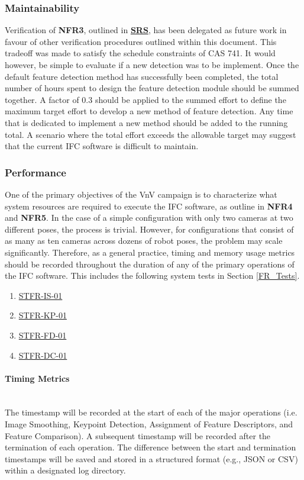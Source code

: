 \documentclass[12pt, titlepage]{article}
\begin{document}
\subsubsection{Maintainability}\label{Maintainability}
Verification of \textbf{NFR3}, outlined in 
\textbf{\href{https://github.com/KiranSingh15/CAS-741-Image-Correspondences/blob/main/docs/SRS/SRS.pdf}
{SRS}}, 
has been delegated as future work in favour of other verification procedures outlined within this 
document. This tradeoff was made to satisfy the schedule constraints of CAS 741. 
It would however, be simple to evaluate if a new detection was to be implement. Once the default feature 
detection method has successfully been completed, the total number of hours spent to design the feature 
detection module should be summed together. A factor of 0.3 should be applied to the summed effort to define 
the maximum target effort to develop a new method of feature detection. Any time that is dedicated to 
implement a new method should be added to the running total. A scenario where the total effort exceeds the 
allowable target may suggest that the current IFC software is difficult to maintain.

\subsubsection{Performance}\label{Performance}
One of the primary objectives of the VnV campaign is to characterize what system resources are required to 
execute the IFC software, as outline in \textbf{NFR4} and \textbf{NFR5}. In the case of a simple configuration 
with only two cameras at two different poses, the process is trivial. However, for configurations that consist 
of as many as ten cameras across dozens of robot poses, the problem may scale significantly. Therefore, as a 
general practice, timing and memory usage metrics should be recorded throughout the duration of any of the 
primary operations of the IFC software. This includes the following system tests in Section \ref{FR_Tests}. 
\begin{enumerate}
\item \hyperlink{STFR-IS-01}{STFR-IS-01}
\item \hyperlink{STFR-KP-01}{STFR-KP-01}
\item \hyperlink{STFR-FD-01}{STFR-FD-01}
\item \hyperlink{STFR-DC-01}{STFR-DC-01}
\end{enumerate}
\paragraph{Timing Metrics}
\mbox{}
\\
The timestamp will be recorded at the start of each of the major operations (i.e. 
Image Smoothing, Keypoint Detection, Assignment of Feature Descriptors, and Feature Comparison). 
A subsequent timestamp will be recorded after the termination of each operation. The difference between 
the start and termination timestamps will be saved and stored in a structured format 
(e.g., JSON or CSV) within a designated log directory.
\end{document}

